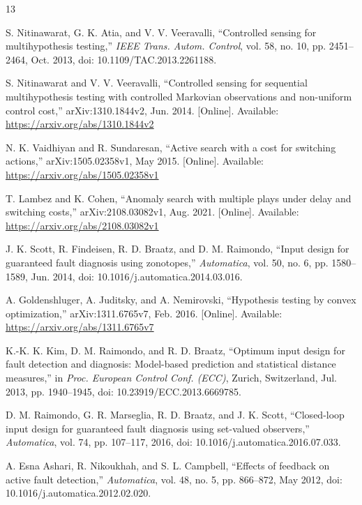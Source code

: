 \documentclass[journal]{IEEEtran}
\begin{document}
\begin{thebibliography}{13}

S. Nitinawarat, G. K. Atia, and V. V. Veeravalli,
``Controlled sensing for multihypothesis testing,''
\emph{IEEE Trans. Autom. Control}, vol. 58, no. 10,
pp. 2451--2464, Oct. 2013, doi: 10.1109/TAC.2013.2261188.

S. Nitinawarat and V. V. Veeravalli,
``Controlled sensing for sequential multihypothesis testing with controlled
Markovian observations and non-uniform control cost,''
arXiv:1310.1844v2, Jun. 2014.
[Online]. Available: \url{https://arxiv.org/abs/1310.1844v2}

N. K. Vaidhiyan and R. Sundaresan,
``Active search with a cost for switching actions,''
arXiv:1505.02358v1, May 2015.
[Online]. Available: \url{https://arxiv.org/abs/1505.02358v1}

T. Lambez and K. Cohen,
``Anomaly search with multiple plays under delay and switching costs,''
arXiv:2108.03082v1, Aug. 2021.
[Online]. Available: \url{https://arxiv.org/abs/2108.03082v1}

J. K. Scott, R. Findeisen, R. D. Braatz, and D. M. Raimondo,
``Input design for guaranteed fault diagnosis using zonotopes,''
\emph{Automatica}, vol. 50, no. 6, pp. 1580--1589, Jun. 2014,
doi: 10.1016/j.automatica.2014.03.016.

A. Goldenshluger, A. Juditsky, and A. Nemirovski,
``Hypothesis testing by convex optimization,''
arXiv:1311.6765v7, Feb. 2016.
[Online]. Available: \url{https://arxiv.org/abs/1311.6765v7}

K.-K. K. Kim, D. M. Raimondo, and R. D. Braatz,
``Optimum input design for fault detection and diagnosis: Model-based prediction
and statistical distance measures,'' in \emph{Proc. European Control Conf. (ECC)},
Zurich, Switzerland, Jul. 2013, pp. 1940--1945,
doi: 10.23919/ECC.2013.6669785.

D. M. Raimondo, G. R. Marseglia, R. D. Braatz, and J. K. Scott,
``Closed-loop input design for guaranteed fault diagnosis using set-valued
observers,'' \emph{Automatica}, vol. 74, pp. 107--117, 2016,
doi: 10.1016/j.automatica.2016.07.033.

A. Esna Ashari, R. Nikoukhah, and S. L. Campbell,
``Effects of feedback on active fault detection,'' \emph{Automatica},
vol. 48, no. 5, pp. 866--872, May 2012,
doi: 10.1016/j.automatica.2012.02.020.


\end{thebibliography}
\end{document}
